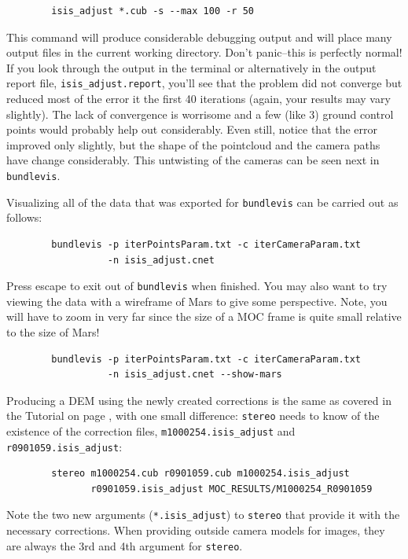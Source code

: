 \begin{verbatim}
        isis_adjust *.cub -s --max 100 -r 50
\end{verbatim}

This command will produce considerable debugging output and will place
many output files in the current working directory. Don't panic--this
is perfectly normal! If you look through the output in the terminal or
alternatively in the output report file, \texttt{isis\_adjust.report},
you'll see that the problem did not converge but reduced most of the
error it the first 40 iterations (again, your results may vary
slightly). The lack of convergence is worrisome and a few (like 3)
ground control points would probably help out considerably. Even
still, notice that the error improved only slightly, but the shape of
the pointcloud and the camera paths have change considerably. This
untwisting of the cameras can be seen next in \texttt{bundlevis}.

Visualizing all of the data that was exported for \texttt{bundlevis}
can be carried out as follows:

\begin{verbatim}
        bundlevis -p iterPointsParam.txt -c iterCameraParam.txt
                  -n isis_adjust.cnet
\end{verbatim}

Press escape to exit out of \texttt{bundlevis} when finished.  You may
also want to try viewing the data with a wireframe of Mars to give
some perspective. Note, you will have to zoom in very far since the
size of a MOC frame is quite small relative to the size of Mars!

\begin{verbatim}
        bundlevis -p iterPointsParam.txt -c iterCameraParam.txt
                  -n isis_adjust.cnet --show-mars
\end{verbatim}

Producing a DEM using the newly created corrections is the same as
covered in the Tutorial on page \pageref{ch:tutorial}, with one small
difference: \texttt{stereo} needs to know of the existence of the
correction files, \texttt{m1000254.isis\_adjust} and
\texttt{r0901059.isis\_adjust}:

\begin{verbatim}
        stereo m1000254.cub r0901059.cub m1000254.isis_adjust
               r0901059.isis_adjust MOC_RESULTS/M1000254_R0901059
\end{verbatim}

Note the two new arguments (\texttt{*.isis\_adjust}) to
\texttt{stereo} that provide it with the necessary corrections. When
providing outside camera models for images, they are always the 3rd
and 4th argument for \texttt{stereo}.

